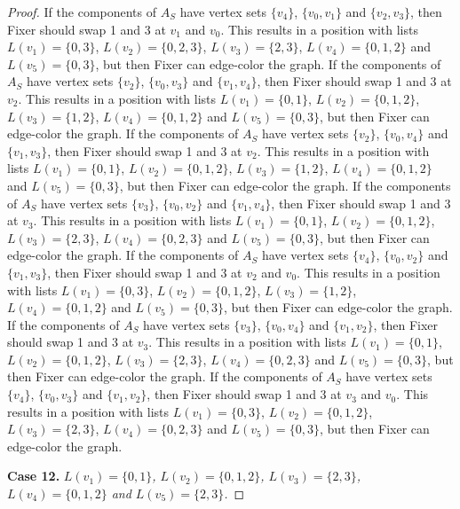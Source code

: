 \documentclass[12pt]{amsart}
\theoremstyle{plain}
\theoremstyle{definition}
\theoremstyle{remark}
\begin{document}
\begin{proof}
If the components of $A_S$ have vertex sets $\{v_4\}$, $\{v_0, v_1\}$ and $\{v_2, v_3\}$, then Fixer should swap 1 and 3 at $v_1$ and $v_0$. This results in a position with lists $L(v_1) = \{0, 3\}$, $L(v_2) = \{0, 2, 3\}$, $L(v_3) = \{2, 3\}$, $L(v_4) = \{0, 1, 2\}$ and $L(v_5) = \{0, 3\}$, but then Fixer can edge-color the graph.
If the components of $A_S$ have vertex sets $\{v_2\}$, $\{v_0, v_3\}$ and $\{v_1, v_4\}$, then Fixer should swap 1 and 3 at $v_2$. This results in a position with lists $L(v_1) = \{0, 1\}$, $L(v_2) = \{0, 1, 2\}$, $L(v_3) = \{1, 2\}$, $L(v_4) = \{0, 1, 2\}$ and $L(v_5) = \{0, 3\}$, but then Fixer can edge-color the graph.
If the components of $A_S$ have vertex sets $\{v_2\}$, $\{v_0, v_4\}$ and $\{v_1, v_3\}$, then Fixer should swap 1 and 3 at $v_2$. This results in a position with lists $L(v_1) = \{0, 1\}$, $L(v_2) = \{0, 1, 2\}$, $L(v_3) = \{1, 2\}$, $L(v_4) = \{0, 1, 2\}$ and $L(v_5) = \{0, 3\}$, but then Fixer can edge-color the graph.
If the components of $A_S$ have vertex sets $\{v_3\}$, $\{v_0, v_2\}$ and $\{v_1, v_4\}$, then Fixer should swap 1 and 3 at $v_3$. This results in a position with lists $L(v_1) = \{0, 1\}$, $L(v_2) = \{0, 1, 2\}$, $L(v_3) = \{2, 3\}$, $L(v_4) = \{0, 2, 3\}$ and $L(v_5) = \{0, 3\}$, but then Fixer can edge-color the graph.
If the components of $A_S$ have vertex sets $\{v_4\}$, $\{v_0, v_2\}$ and $\{v_1, v_3\}$, then Fixer should swap 1 and 3 at $v_2$ and $v_0$. This results in a position with lists $L(v_1) = \{0, 3\}$, $L(v_2) = \{0, 1, 2\}$, $L(v_3) = \{1, 2\}$, $L(v_4) = \{0, 1, 2\}$ and $L(v_5) = \{0, 3\}$, but then Fixer can edge-color the graph.
If the components of $A_S$ have vertex sets $\{v_3\}$, $\{v_0, v_4\}$ and $\{v_1, v_2\}$, then Fixer should swap 1 and 3 at $v_3$. This results in a position with lists $L(v_1) = \{0, 1\}$, $L(v_2) = \{0, 1, 2\}$, $L(v_3) = \{2, 3\}$, $L(v_4) = \{0, 2, 3\}$ and $L(v_5) = \{0, 3\}$, but then Fixer can edge-color the graph.
If the components of $A_S$ have vertex sets $\{v_4\}$, $\{v_0, v_3\}$ and $\{v_1, v_2\}$, then Fixer should swap 1 and 3 at $v_3$ and $v_0$. This results in a position with lists $L(v_1) = \{0, 3\}$, $L(v_2) = \{0, 1, 2\}$, $L(v_3) = \{2, 3\}$, $L(v_4) = \{0, 2, 3\}$ and $L(v_5) = \{0, 3\}$, but then Fixer can edge-color the graph.

\noindent\textbf{Case 12.  }\textit{$L(v_1) = \{0, 1\}$, $L(v_2) = \{0, 1, 2\}$, $L(v_3) = \{2, 3\}$, $L(v_4) = \{0, 1, 2\}$ and $L(v_5) = \{2, 3\}$.}


\end{proof}
\end{document}

